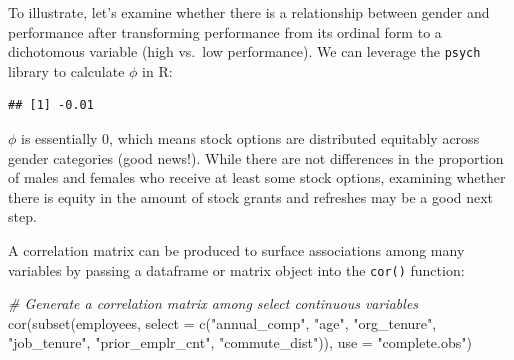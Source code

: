 \documentclass[
]{book}
\newenvironment{Shaded}{\begin{snugshade}}{\end{snugshade}}
\newcommand{\AttributeTok}[1]{\textcolor[rgb]{0.77,0.63,0.00}{#1}}
\newcommand{\CommentTok}[1]{\textcolor[rgb]{0.56,0.35,0.01}{\textit{#1}}}
\newcommand{\DecValTok}[1]{\textcolor[rgb]{0.00,0.00,0.81}{#1}}
\newcommand{\FunctionTok}[1]{\textcolor[rgb]{0.00,0.00,0.00}{#1}}
\newcommand{\NormalTok}[1]{#1}
\newcommand{\OtherTok}[1]{\textcolor[rgb]{0.56,0.35,0.01}{#1}}
\newcommand{\SpecialCharTok}[1]{\textcolor[rgb]{0.00,0.00,0.00}{#1}}
\newcommand{\StringTok}[1]{\textcolor[rgb]{0.31,0.60,0.02}{#1}}
\begin{document}
To illustrate, let's examine whether there is a relationship between gender and performance after transforming performance from its ordinal form to a dichotomous variable (high vs.~low performance). We can leverage the \texttt{psych} library to calculate \(\phi\) in R:

\begin{Shaded}
\end{Shaded}

\begin{verbatim}
## [1] -0.01
\end{verbatim}

\(\phi\) is essentially 0, which means stock options are distributed equitably across gender categories (good news!). While there are not differences in the proportion of males and females who receive at least some stock options, examining whether there is equity in the amount of stock grants and refreshes may be a good next step.

A correlation matrix can be produced to surface associations among many variables by passing a dataframe or matrix object into the \texttt{cor()} function:

\begin{Shaded}
\begin{Highlighting}[]
\CommentTok{\# Generate a correlation matrix among select continuous variables}
\FunctionTok{cor}\NormalTok{(}\FunctionTok{subset}\NormalTok{(employees, }\AttributeTok{select =} \FunctionTok{c}\NormalTok{(}\StringTok{"annual\_comp"}\NormalTok{, }\StringTok{"age"}\NormalTok{, }\StringTok{"org\_tenure"}\NormalTok{, }\StringTok{"job\_tenure"}\NormalTok{, }\StringTok{"prior\_emplr\_cnt"}\NormalTok{, }\StringTok{"commute\_dist"}\NormalTok{)), }\AttributeTok{use =} \StringTok{"complete.obs"}\NormalTok{)}
\end{Highlighting}
\end{Shaded}
\end{document}
